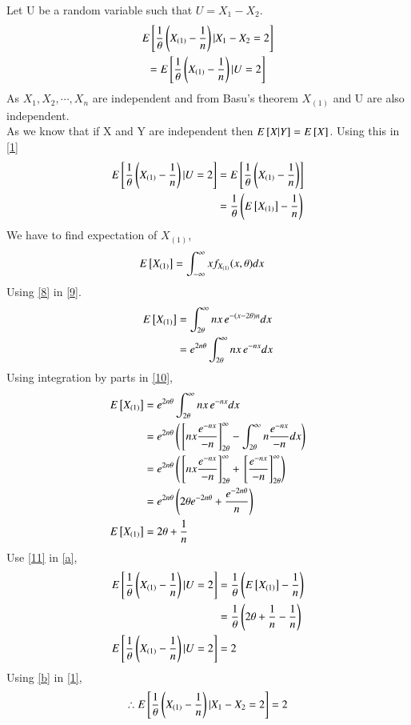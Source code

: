 \documentclass[journal,12pt,twocolumn]{IEEEtran}
\begin{document}
Let U be a random variable such that $U=X_1-X_2$.
\begin{multline}
    E{}\left[ \frac{1}{\theta}\left(X_{(1)}-\frac{1}{n}\right)|X_1-X_2=2 \right]\\=E{}\left[ \frac{1}{\theta}\left(X_{(1)}-\frac{1}{n}\right)|U=2 \right]\label{1}
\end{multline}
As $X_1,X_2,\cdots,X_n$ are independent and from Basu's theorem $X_{(1)}$ and U are also independent. \\As we know that if X and Y are independent then $E{}\left[ X|Y \right]=E{}\left[ X \right]$. 
Using this in \eqref{1}
\begin{align}
 \nonumber   E{}\left[ \frac{1}{\theta}\left(X_{(1)}-\frac{1}{n}\right)|U=2 \right]
    &=E{}\left[ \frac{1}{\theta}\left(X_{(1)}-\frac{1}{n}\right) \right]\\
    &=\frac{1}{\theta}\left(E{}\left[ X_{(1)} \right]-\frac{1}{n}\right)\label{a}
\end{align}
We have to find expectation of $X_{(1)}$,
\begin{align}
   E{}\left[ X_{(1)} \right]&=\int_{-\infty}^{\infty} x f_{X_{(1)}}{(x,\theta)} dx \label{9}
\end{align}
Using \eqref{8} in \eqref{9}.
\begin{align}
\nonumber E{}\left[ X_{(1)} \right]&=\int_{2\theta}^{\infty} n x\,e^{-(x-2\theta)n} dx\\
  &= e^{2n\theta}\int_{2\theta}^{\infty} n x\,e^{-n x} dx \label{10}
\end{align}
Using integration by parts in \eqref{10},
\begin{align}
    \nonumber E{}\left[ X_{(1)} \right]
  &= e^{2n\theta}\int_{2\theta}^{\infty}nx\,e^{-n x}dx\\
      \nonumber &= e^{2n\theta}\left({}\left[n x \frac{e^{-n x}}{-n}\right]_{2\theta}^{\infty}-\int_{2\theta}^{\infty} n \frac{e^{-n x}}{-n}dx\right)\\
  \nonumber &= e^{2n\theta}\left({}\left[n x \frac{e^{-n x}}{-n}\right]_{2\theta}^{\infty}+{}\left[\frac{e^{-n x}}{-n}\right]_{2\theta}^{\infty}\right)\\
  \nonumber &= e^{2n\theta}\left(2\theta e^{-2n\theta}+\frac{e^{-2n\theta}}{n}\right)\\
  E{}\left[ X_{(1)} \right] &= 2\theta+\frac{1}{n}\label{11}
\end{align}
Use \eqref{11} in \eqref{a},
\begin{align}
   \nonumber E{}\left[ \frac{1}{\theta}\left(X_{(1)}-\frac{1}{n}\right)|U=2 \right]
    &=\frac{1}{\theta}\left(E{}\left[ X_{(1)} \right]-\frac{1}{n}\right)\\
   \nonumber &=\frac{1}{\theta}\left(2\theta+\frac{1}{n}-\frac{1}{n}\right)\\
   E{}\left[ \frac{1}{\theta}\left(X_{(1)}-\frac{1}{n}\right)|U=2 \right] &= 2\label{b}
\end{align}
Using \eqref{b} in \eqref{1},
\begin{align}
     \nonumber\therefore   E{}\left[ \frac{1}{\theta}\left(X_{(1)}-\frac{1}{n}\right)|X_1-X_2=2 \right]=2
\end{align}
\end{document}
